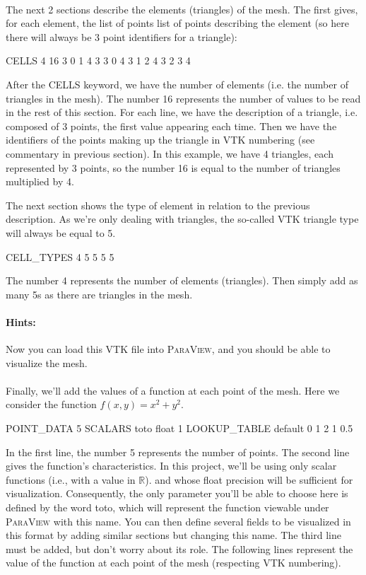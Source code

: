 \documentclass[english,10pt,a4paper]{article}
\begin{document}
\paragraph{}
The next 2 sections describe the elements (triangles) of the mesh. The first gives, for each element, the list of points
list of points describing the element (so here there will always be 3 point identifiers for a triangle):
\begin{mycpplistingInTabular}{}
CELLS 4 16
3 0 1 4
3 3 0 4
3 1 2 4
3 2 3 4
\end{mycpplistingInTabular}
After the CELLS keyword, we have the number of elements (i.e. the number of triangles in the mesh). The number 16 represents the number of values to be read in the rest of this section.
For each line, we have the description of a triangle, i.e. composed of 3 points, the first value appearing each time. Then we have the identifiers of the points making up the triangle
in VTK numbering (see commentary in previous section).
In this example, we have 4 triangles, each represented by 3 points, so the number 16 is equal to the number of triangles multiplied by 4.

The next section shows the type of element in relation to the previous description. As we're only dealing with triangles, the so-called VTK triangle type will always be equal to 5.
\begin{mycpplistingInTabular}{}
CELL_TYPES 4
5
5
5
5
\end{mycpplistingInTabular}
The number 4 represents the number of elements (triangles). Then simply add as many 5s as there are triangles in the mesh.


\paragraph{Hints:}
Now you can load this VTK file into \textsc{ParaView}, and you should be able to visualize the mesh.

\paragraph{}
Finally, we'll add the values of a function at each point of the mesh. Here we consider the function $f(x,y)=x^2+y^2$.
\begin{mycpplistingInTabular}{}
POINT_DATA 5
SCALARS toto float 1
LOOKUP_TABLE default
0
1
2
1
0.5
\end{mycpplistingInTabular}
In the first line, the number 5 represents the number of points.
The second line gives the function's characteristics. In this project, we'll be using only scalar functions (i.e., with a value in $\mathbb{R}$).
and whose float precision will be sufficient for visualization.
Consequently, the only parameter you'll be able to choose here is defined by the word toto, which will represent the function viewable under \textsc{ParaView} with this name.
You can then define several fields to be visualized in this format by adding similar sections but changing this name.
The third line must be added, but don't worry about its role.
The following lines represent the value of the function at each point of the mesh (respecting VTK numbering).
\end{document}
